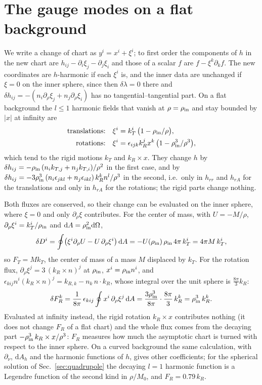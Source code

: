 \documentclass[aps,prd,twocolumn,superscriptaddress, nofootinbib,floatfix]{revtex4-2}
\newcommand{\dd}{\mathrm{d}}
\begin{document}
\appendix
\section{The gauge modes on a flat background}\label{app:modes}

We write a change of chart as $y^i = x^i+\xi^i$; to first order the components of $h$ in the new chart are $h_{ij}-\partial_i\xi_j-\partial_j\xi_i$ and those of a scalar $f$ are $f-\xi^k\partial_kf$.
The new coordinates are $h$-harmonic if each $\xi^i$ is, and the inner data are unchanged if $\xi=0$ on the inner sphere, since then $\delta\lambda=0$ there and $\delta h_{ij} = -(n_i\partial_\rho\xi_j+n_j\partial_\rho\xi_i)$ has no tangential--tangential part.
On a flat background the $l\le1$ harmonic fields that vanish at $\rho=\rho_{\rm in}$ and stay bounded by $|x|$ at infinity are
\begin{align}
  \text{translations:}\quad & \xi^i = k_T^i\,\bigl(1-\rho_{\rm in}/\rho\bigr), \\
  \text{rotations:}\quad & \xi^i = \epsilon_{ijk}k_R^jx^k\,\bigl(1-\rho_{\rm in}^3/\rho^3\bigr),
\end{align}
which tend to the rigid motions $k_T$ and $k_R\times x$.
They change $h$ by $\delta h_{ij} = -\rho_{\rm in}\,(n_ik_{T,j}+n_jk_{T,i})/\rho^2$ in the first case, and by $\delta h_{ij} = -3\rho_{\rm in}^3\,(n_i\epsilon_{jkl}+n_j\epsilon_{ikl})\,k_R^kn^l/\rho^3$ in the second, i.e.\ only in $h_{rr}$ and $h_{rA}$ for the translations and only in $h_{rA}$ for the rotations; the rigid parts change nothing.

Both fluxes are conserved, so their change can be evaluated on the inner sphere, where $\xi=0$ and only $\partial_\rho\xi$ contributes.
For the center of mass, with $U = -M/\rho$, $\partial_\rho\xi^i = k_T^i/\rho_{\rm in}$ and $\dd A = \rho_{\rm in}^2\dd\Omega$,
\begin{equation}
  \delta D^i = \oint\bigl(\xi^i\partial_\rho U - U\,\partial_\rho\xi^i\bigr)\,\dd A = -U(\rho_{\rm in})\,\rho_{\rm in}\,4\pi\,k_T^i = 4\pi M\,k_T^i ,
\end{equation}
so $F_T = M k_T$, the center of mass of a mass $M$ displaced by $k_T$.
For the rotation flux, $\partial_\rho\xi^j = 3\,(k_R\times n)^j$ at $\rho_{\rm in}$, $x^i = \rho_{\rm in}n^i$, and $\epsilon_{kij}n^i(k_R\times n)^j = k_{R,k}-n_k\,n\cdot k_R$, whose integral over the unit sphere is $\tfrac{8\pi}{3}k_R$:
\begin{equation}
  \delta F_R^k = \frac1{8\pi}\,\epsilon_{kij}\oint x^i\,\partial_\rho\xi^j\,\dd A = \frac{3\rho_{\rm in}^3}{8\pi}\cdot\frac{8\pi}3\,k_R^k = \rho_{\rm in}^3\,k_R^k .
\end{equation}
Evaluated at infinity instead, the rigid rotation $k_R\times x$ contributes nothing (it does not change $F_R$ of a flat chart) and the whole flux comes from the decaying part $-\rho_{\rm in}^3\,k_R\times x/\rho^3$: $F_R$ measures how much the asymptotic chart is turned with respect to the inner sphere.
On a curved background the same calculation, with $\partial_\nu$, $\dd A_h$ and the harmonic functions of $h$, gives other coefficients; for the spherical solution of Sec.~\ref{sec:quadrupole} the decaying $l=1$ harmonic function is a Legendre function of the second kind in $\rho/M_0$, and $F_R = 0.79\,k_R$.
\end{document}
